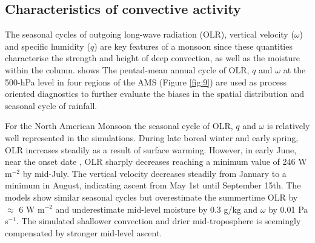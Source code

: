 \subsection{Characteristics of convective activity}




The seasonal cycles of outgoing long-wave radiation (OLR), vertical velocity ($\omega$) and specific humidity ($q$) are key features of a monsoon since these quantities characterise the strength and height of deep convection, as well as the moisture within the column.
 shows The pentad-mean annual cycle of OLR, $q$ and $\omega$ at the 500-hPa level in four regions of the AMS (Figure \ref{fig:9}) are used as process oriented diagnostics to further evaluate the biases in the spatial distribution and seasonal cycle of rainfall.
 

For the North American Monsoon the seasonal cycle of OLR, $q$ and $\omega$ is relatively well represented in the simulations.
During late boreal winter and early spring, OLR increases steadily as a result of surface warming.
However, in early June, near the onset date \citep{douglas1993,geil2013}, OLR sharply decreases reaching a minimum value of 246 W m$^{-2}$ by mid-July.
The vertical velocity decreases steadily from January to a minimum in August, indicating ascent from May 1st until September 15th.
 The models show similar seasonal cycles but overestimate the summertime OLR by $\approx$ 6 W m$^{-2}$ and underestimate mid-level moisture by 0.3 g/kg and $\omega$ by 0.01 Pa s$^{-1}$. 
The simulated shallower convection and drier mid-troposphere is seemingly compensated by stronger mid-level ascent.

